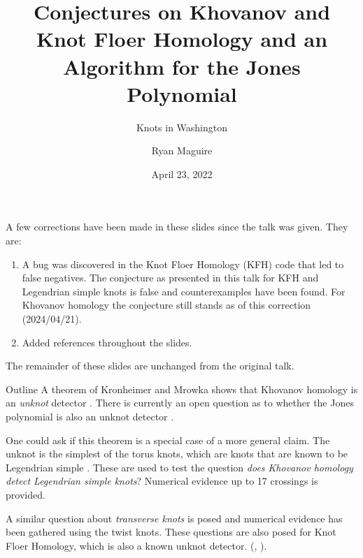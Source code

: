 \documentclass{beamer}
\title{%
    Conjectures on Khovanov and Knot Floer Homology and an
    Algorithm for the Jones Polynomial
}
\subtitle{Knots in Washington}
\author{Ryan Maguire}
\institute{Dartmouth College}
\date{April 23, 2022}
\begin{document}
    \maketitle
    \begin{frame}{\textbf{\color{red}{Corrections}}}
        A few corrections have been made in these slides since the talk was
        given. They are:
        \begin{enumerate}
            \item
                A bug was discovered in the Knot Floer Homology (KFH) code that
                led to false negatives. The conjecture as presented in this
                talk for KFH and Legendrian simple knots is false and
                counterexamples have been found. For Khovanov homology the
                conjecture still stands as of this correction
                (2024/04/21).
            \item Added references throughout the slides.
        \end{enumerate}
        The remainder of these slides are unchanged from the original talk.
    \end{frame}
    \begin{frame}{Outline}
        A theorem of Kronheimer and Mrowka shows that Khovanov homology is
        an \textit{unknot} detector
        \cite{KronheimerMrowka2011KhovanovUnknot}.
        There is currently an open question as to
        whether the Jones polynomial is also an unknot detector
        \cite{VerificationUnknotJonesConjUpTo24}.
        \par\hfill\par
        One could ask if this theorem is a special case of a more general claim.
        The unknot is the simplest of the torus knots, which are knots that are
        known to be Legendrian simple
        \cite[p.~64]{EtnyreHondaContactTopologyI}.
        These are used to test the question
        \textit{does Khovanov homology detect Legendrian simple knots}?
        Numerical evidence up to 17 crossings is provided.
        \par\hfill\par
        A similar question about \textit{transverse knots} is posed and
        numerical evidence has been gathered using the twist knots. These
        questions are also posed for Knot Floer Homology, which is also a
        known unknot detector.
        (\cite[p.~633]{ManolescuOzsvathSarkarCombinatorialDescriptionOfKnotFloerHomology},
        \cite[p.~313]{OzsvathSzaboHolomorphicDisksGenusBounds}).
    \end{frame}
\end{document}
